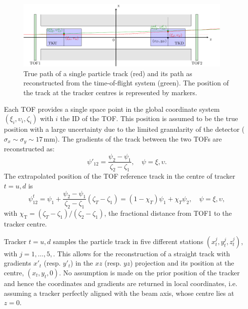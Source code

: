 \begin{figure}
	\begin{center}
		\includegraphics[width=0.95\textwidth]{alignment.pdf}
	\end{center}
	\caption{
		True path of a single particle track (red) and its path as reconstructed from the time-of-flight system (green). The position of the track at the tracker centres is represented by markers.
	}
	\label{fig:align_bl}
\end{figure}

Each TOF provides a single space point in the global coordinate system $(\xi_i, \upsilon_i, \zeta_i)$ with $i$ the ID of the TOF. This position is assumed to be the true position with a large uncertainty due to the limited granularity of the detector ($\sigma_x\sim\sigma_y\sim17$\,mm). The gradients of the track between the two TOFs are reconstructed as:
\begin{equation}
\psi'_{12}=\frac{\psi_2-\psi_1}{\zeta_2-\zeta_1},\quad\psi=\xi,\upsilon.
\end{equation}
The extrapolated position of the TOF reference track in the centre of tracker $t=u,d$ is
\begin{equation}
\psi_{12}^t=\psi_1+\frac{\psi_2-\psi_1}{\zeta_2-\zeta_1}(\zeta_T-\zeta_1)=(1-\chi_T)\psi_1+\chi_T\psi_2,\quad\psi=\xi,\upsilon,
\end{equation}
with $\chi_\mathrm{T}=(\zeta_T-\zeta_1)/(\zeta_2-\zeta_1)$, the fractional distance from TOF1 to the tracker centre.

Tracker $t=u,d$ samples the particle track in five different stations $(x_t^j, y_t^j, z_t^j)$, with $j=1,\dots,5,$. This allows for the reconstruction of a straight track with gradients $x'_t$ (resp. $y'_t$) in the $xz$ (resp. $yz$) projection and its position at the centre, $(x_t, y_t, 0)$. No assumption is made on the prior position of the tracker and hence the coordinates and gradients are returned in local coordinates, i.e. assuming a tracker perfectly aligned with the beam axis, whose centre lies at $z=0$.

